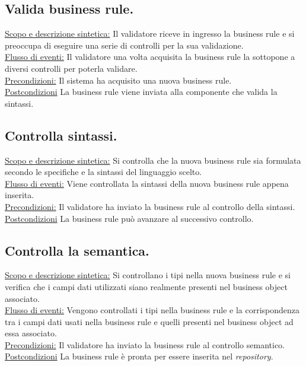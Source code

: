 \documentclass[11pt,titlepage,a4paper]{report}
\begin{document}
\subsection{Valida business rule.}
\underline{Scopo e descrizione sintetica:} Il validatore riceve in ingresso la business rule e si preoccupa di eseguire una serie di controlli per la sua validazione.\\
\underline{Flusso di eventi:} Il validatore una volta acquisita la business rule la sottopone a diversi controlli per poterla validare.\\
\underline{Precondizioni:} Il sistema ha acquisito una nuova business rule.\\
\underline{Postcondizioni} La business rule viene inviata alla componente che valida la sintassi.

\subsection{Controlla sintassi.}
\underline{Scopo e descrizione sintetica:} Si controlla che la nuova business rule sia formulata secondo le specifiche e la sintassi del linguaggio scelto.\\
\underline{Flusso di eventi:} Viene controllata la sintassi della nuova business rule appena inserita.\\
\underline{Precondizioni:} Il validatore ha inviato la business rule al controllo della sintassi.\\
\underline{Postcondizioni} La business rule pu\`o avanzare al successivo controllo.

\subsection{Controlla la semantica.}
\underline{Scopo e descrizione sintetica:} Si controllano i tipi nella nuova business rule e si verifica che i campi dati utilizzati siano realmente presenti nel business object associato.\\
\underline{Flusso di eventi:} Vengono controllati i tipi nella business rule e la corrispondenza tra i campi dati usati nella business rule e quelli presenti nel business object ad essa associato.\\
\underline{Precondizioni:} Il validatore ha inviato la business rule al controllo semantico.\\
\underline{Postcondizioni} La business rule \`e pronta per essere inserita nel \textit{repository}.
\end{document}
